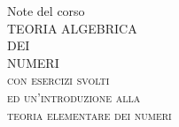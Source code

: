 {\thispagestyle{empty}\centering
\vspace{1\textheight}
{\large Note del corso}\\[\baselineskip]
{\Huge TEORIA ALGEBRICA}\\[\baselineskip]
{\Large DEI}\\[\baselineskip]
{\Huge NUMERI}\\[\baselineskip]
{\scshape con esercizi svolti}\\
{\scshape ed un'introduzione alla}\\
{\large\scshape teoria elementare dei numeri}\\
\vfill\null}

